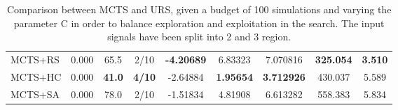 \documentclass[11pt]{article}
\begin{document}
\begin{table}[ht]
\begin{tabular}{|l|l|c|c|c|c|c|c|c|}
MCTS+RS                                     & 0.000              &  65.5                   & 2/10                          & \textbf{-4.20689}  & 6.83323  & 7.070816 & \textbf{325.054} &  \textbf{3.510}    \\
MCTS+HC                                     & 0.000              &  \textbf{41.0}          & \textbf{4/10}                          & -2.64884  & \textbf{1.95654}  & \textbf{3.712926} &  430.037 &  5.589    \\
MCTS+SA                                     & 0.000              &  78.0                   & 2/10                          & -1.51834  & 4.81908  & 6.613282 &  558.383 &  5.834    \\ \hline
\end{tabular}
\caption{Comparison between MCTS and URS, given a budget of 100 simulations and varying the parameter C in order to balance exploration and exploitation in the search. The input signals have been split into 2 and 3 region.}~\label{table:res:s1}
\end{table}
\end{document}
